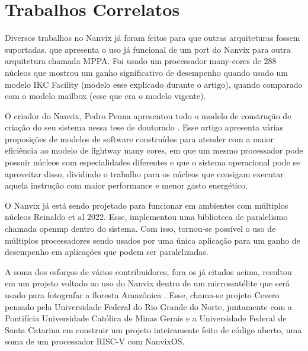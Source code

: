 \section{Trabalhos Correlatos}

Diversos trabalhos no Nanvix já foram feitos para que outras arquiteturas fossem suportadas. \cite{PENNA20211} que apresenta o uso já funcional de um port do 
Nanvix para outra arquitetura chamada MPPA. Foi usado um processador many-cores de 288 núcleos que mostrou um ganho significativo de desempenho quando usado um 
modelo IKC Facility (modelo esse explicado durante o artigo), quando comparado com o modelo mailbox (esse que era o modelo vigente).

O criador do Nanvix, Pedro Penna apresentou todo o modelo de construção de criação do seu sistema nessa tese de doutorado \cite{penna:tel-03545212}. Esse artigo 
apresenta várias proposições de modelos de software construídos para atender com a maior eficiência ao modelo de lightway many cores, em que um mesmo processador 
pode possuir núcleos com especialidades diferentes e que o sistema operacional pode se aproveitar disso, dividindo o trabalho para os núcleos que consigam executar 
aquela instrução com maior performance e menor gasto energético.

O Nanvix já está sendo projetado para funcionar em ambientes com múltiplos núcleos Reinaldo et al {2022}. Esse, implementou uma biblioteca de paralelismo chamada 
openmp dentro do sistema. Com isso, tornou-se possível o uso de múltiplos processadores sendo usados por uma única aplicação para um ganho de desempenho em aplicações 
que podem ser paralelizadas.

A soma dos esforços de vários contribuidores, fora os já citados acima, resultou em um projeto voltado ao uso do Nanvix dentro de um microssatélite que será usado 
para fotografar a floresta Amazônica \cite{RepoCervero}. Esse, chama-se projeto Cevero pensado pela Universidade Federal do Rio Grande do Norte, juntamente com a 
Pontifícia Universidade Católica de Minas Gerais e a Universidade Federal de Santa Catarina em construir um projeto inteiramente feito de código aberto, uma soma 
de um processador RISC-V com NanvixOS.